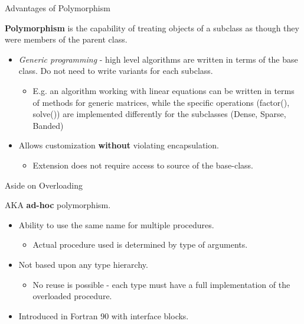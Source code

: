 \documentclass[11pt]{beamer}
\begin{document}

\begin{frame}{Advantages of Polymorphism}

\textbf{Polymorphism} is the capability of treating objects of a subclass as though they were members of the parent class.
\begin{itemize}

  \item \emph{Generic programming} - high level algorithms are written in terms of the base class. Do not need to write variants for each subclass.
      \begin{itemize}
    \item E.g. an algorithm working with linear equations can be written in terms of methods for generic matrices, while the specific operations (factor(), solve()) are implemented differently for the subclasses (Dense, Sparse, Banded)
    \end{itemize}

  \item Allows customization \textbf{without} violating encapsulation.
      \begin{itemize}
    \item Extension does not require access to source of the base-class.
    \end{itemize}
  
 \end{itemize}

\end{frame}


\begin{frame}{Aside on Overloading}

AKA \textbf{ad-hoc} polymorphism.
\begin{itemize}

  \item Ability to use the same name for multiple procedures.
    \begin{itemize}
    \item Actual procedure used is determined by type of arguments.
    \end{itemize}

  \item Not based upon any type hierarchy.
    \begin{itemize}
    \item No reuse is possible - each type must have a full implementation of the overloaded procedure.
    \end{itemize}
 
   \item Introduced in Fortran 90 with interface blocks.
 
 \end{itemize}

\end{frame}
\end{document}
